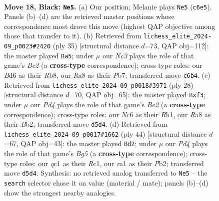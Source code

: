 \documentclass[11pt]{article}
\begin{document}
\clearpage

\begin{figure}[p]\centering
\begin{subfigure}{0.46\textwidth}\centering
\resizebox{\linewidth}{!}{%
\newchessgame
\chessboard[
  setfen={r3r1k1/pp5p/2nbpqp1/3p4/2P5/N2B2P1/PP3P1P/R1Q1R1K1 b - - 0 18},
  showmover=false,
  pgfstyle=straightmove, color=movearrow, markmove={c6-e5}
]}
\caption{}
\end{subfigure}\hfill
\begin{subfigure}{0.46\textwidth}\centering
\resizebox{\linewidth}{!}{%
\newchessgame
\chessboard[
  setfen={1r2r1k1/1pb3p1/p1n1pq1p/3p4/2P5/3B1N1P/PP1Q1PP1/R3R1K1 b - - 1 18},
  showmover=false,
  pgfstyle=straightmove, color=movearrow, markmove={c7-a5}
]}
\caption{}
\end{subfigure}
\\[4pt]
\begin{subfigure}{0.46\textwidth}\centering
\resizebox{\linewidth}{!}{%
\newchessgame
\chessboard[
  setfen={r1bqr1k1/pp3ppp/1pP5/3n4/Q7/4Pp2/PB1PBPPP/R3K2R w KQ - 0 15},
  showmover=false,
  pgfstyle=straightmove, color=movearrow, markmove={e2-f3}
]}
\caption{}
\end{subfigure}\hfill
\begin{subfigure}{0.46\textwidth}\centering
\resizebox{\linewidth}{!}{%
\newchessgame
\chessboard[
  setfen={2q1rr1k/pb4p1/1pp4p/3nPpBP/8/1Q4PB/PP3P2/2R1R1K1 w - - 0 23},
  showmover=false,
  pgfstyle=straightmove, color=movearrow, markmove={g5-d2}
]}
\caption{}
\end{subfigure}
\caption{\textbf{Move 18, Black: \texttt{Ne5}.} (a) Our position; Melanie plays \texttt{Ne5} (\texttt{c6e5}). Panels (b)--(d) are the retrieved master positions whose correspondence most drove this move (highest QAP objective among those that transfer to it). (b) Retrieved from \texttt{lichess\_elite\_2024-09\_p0023\#2420} (ply 35) [structural distance $d$=73, QAP obj=112]: the master played \texttt{Ba5}; under $\mu$ our \emph{Nc3} plays the role of that game's \emph{Bc2} (a \textbf{cross-type} correspondence); cross-type roles: our \emph{B}d6 as their \emph{R}b8, our \emph{R}a8 as their \emph{P}b7; transferred move \texttt{c6b4}. (c) Retrieved from \texttt{lichess\_elite\_2024-09\_p0018\#3971} (ply 28) [structural distance $d$=70, QAP obj=65]: the master played \texttt{Bxf3}; under $\mu$ our \emph{Pd4} plays the role of that game's \emph{Be2} (a \textbf{cross-type} correspondence); cross-type roles: our \emph{N}c6 as their \emph{R}h1, our \emph{R}a8 as their \emph{B}b2; transferred move \texttt{d5d4}. (d) Retrieved from \texttt{lichess\_elite\_2024-09\_p0017\#1662} (ply 44) [structural distance $d$=67, QAP obj=43]: the master played \texttt{Bd2}; under $\mu$ our \emph{Pd4} plays the role of that game's \emph{Bg5} (a \textbf{cross-type} correspondence); cross-type roles: our \emph{q}c1 as their \emph{R}c1, our \emph{r}a1 as their \emph{P}b2; transferred move \texttt{d5d4}. Synthesis: no retrieved analog transferred to \texttt{Ne5} -- the \texttt{search} selector chose it on value (material / mate); panels (b)--(d) show the strongest nearby analogies.}
\label{fig:thought-m35}
\end{figure}
\end{document}
